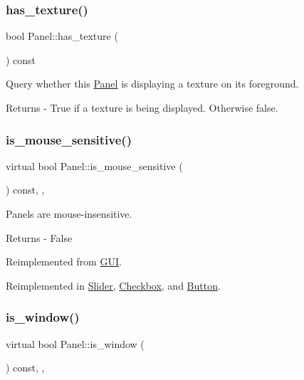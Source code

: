 \subsubsection{\texorpdfstring{has\+\_\+texture()}{has\_texture()}}
{\footnotesize\ttfamily bool Panel\+::has\+\_\+texture (\begin{DoxyParamCaption}{ }\end{DoxyParamCaption}) const}

Query whether this \mbox{\hyperlink{class_panel}{Panel}} is displaying a texture on its foreground. \begin{DoxyReturn}{Returns}
-\/ True if a texture is being displayed. Otherwise false. 
\end{DoxyReturn}
\mbox{\label{class_panel_a607fe6e1be6fd056f199fa817a4dedda}} 
\subsubsection{\texorpdfstring{is\+\_\+mouse\+\_\+sensitive()}{is\_mouse\_sensitive()}}
{\footnotesize\ttfamily virtual bool Panel\+::is\+\_\+mouse\+\_\+sensitive (\begin{DoxyParamCaption}{ }\end{DoxyParamCaption}) const\hspace{0.3cm}{\ttfamily [inline]}, {\ttfamily [override]}, {\ttfamily [virtual]}}

Panels are mouse-\/insensitive. \begin{DoxyReturn}{Returns}
-\/ False 
\end{DoxyReturn}


Reimplemented from \mbox{\hyperlink{class_g_u_i_aff34edd65faff6f3e908070a2060f6b8}{G\+UI}}.



Reimplemented in \mbox{\hyperlink{class_slider_a8d7d12aa4bc5d26de46790b43116bcc1}{Slider}}, \mbox{\hyperlink{class_checkbox_a63fc27bae94d81d4dee8cd2d0e474d2b}{Checkbox}}, and \mbox{\hyperlink{class_button_aa2b16ae30fe74f215aa79c699bbf8510}{Button}}.

\mbox{\label{class_panel_a9a30fff40fad1f0845c0c7aa2786f772}} 
\subsubsection{\texorpdfstring{is\+\_\+window()}{is\_window()}}
{\footnotesize\ttfamily virtual bool Panel\+::is\+\_\+window (\begin{DoxyParamCaption}{ }\end{DoxyParamCaption}) const\hspace{0.3cm}{\ttfamily [inline]}, {\ttfamily [override]}, {\ttfamily [virtual]}}


